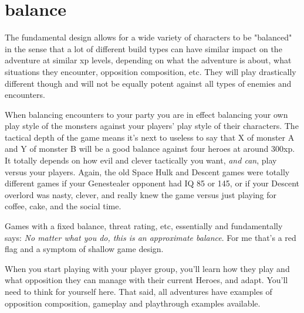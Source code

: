 \section*{balance}
The fundamental design allows for a wide variety of characters to be "balanced" in the sense that a lot of different build types can have similar impact on the adventure at similar xp levels, depending on what the adventure is about, what situations they encounter, opposition composition, etc. They will play drastically different though and will not be equally potent against all types of enemies and encounters.

When balancing encounters to your party you are in effect balancing your own play style of the monsters against your players' play style of their characters. The tactical depth of the game means it's next to useless to say that X of monster A and Y of monster B will be a good balance against four heroes at around 300xp. It totally depends on how evil and clever tactically you want, \emph{and can}, play versus your players. Again, the old Space Hulk and Descent games were totally different games if your Genestealer opponent had IQ 85 or 145, or if your Descent overlord was nasty, clever, and really knew the game versus just playing for coffee, cake, and the social time.

Games with a fixed balance, threat rating, etc, essentially and fundamentally says: \emph{No matter what you do, this is an approximate balance}. For me that's a red flag and a symptom of shallow game design.

When you start playing with your player group, you'll learn how they play and what opposition they can manage with their current Heroes, and adapt. You'll need to think for yourself here. That said, all adventures have examples of opposition composition, gameplay and playthrough examples available.

\

